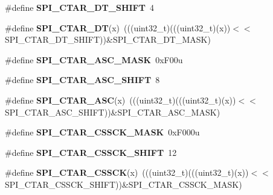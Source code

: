 \begin{DoxyCompactItemize}
\item 
\#define {\bfseries S\+P\+I\+\_\+\+C\+T\+A\+R\+\_\+\+D\+T\+\_\+\+S\+H\+I\+FT}~4\hypertarget{group__SPI__Register__Masks_gaac557ee81ac4ec00ee6280d5b761edf1}{}\label{group__SPI__Register__Masks_gaac557ee81ac4ec00ee6280d5b761edf1}

\item 
\#define {\bfseries S\+P\+I\+\_\+\+C\+T\+A\+R\+\_\+\+DT}(x)~(((uint32\+\_\+t)(((uint32\+\_\+t)(x))$<$$<$S\+P\+I\+\_\+\+C\+T\+A\+R\+\_\+\+D\+T\+\_\+\+S\+H\+I\+FT))\&S\+P\+I\+\_\+\+C\+T\+A\+R\+\_\+\+D\+T\+\_\+\+M\+A\+SK)\hypertarget{group__SPI__Register__Masks_ga48f6e8c7555056687cfcc2c56fc63c46}{}\label{group__SPI__Register__Masks_ga48f6e8c7555056687cfcc2c56fc63c46}

\item 
\#define {\bfseries S\+P\+I\+\_\+\+C\+T\+A\+R\+\_\+\+A\+S\+C\+\_\+\+M\+A\+SK}~0x\+F00u\hypertarget{group__SPI__Register__Masks_gad15c92f5474cc1ba1ca2af14c92cbf26}{}\label{group__SPI__Register__Masks_gad15c92f5474cc1ba1ca2af14c92cbf26}

\item 
\#define {\bfseries S\+P\+I\+\_\+\+C\+T\+A\+R\+\_\+\+A\+S\+C\+\_\+\+S\+H\+I\+FT}~8\hypertarget{group__SPI__Register__Masks_gadbf91ef3bf1d4943ab782ff027d121bd}{}\label{group__SPI__Register__Masks_gadbf91ef3bf1d4943ab782ff027d121bd}

\item 
\#define {\bfseries S\+P\+I\+\_\+\+C\+T\+A\+R\+\_\+\+A\+SC}(x)~(((uint32\+\_\+t)(((uint32\+\_\+t)(x))$<$$<$S\+P\+I\+\_\+\+C\+T\+A\+R\+\_\+\+A\+S\+C\+\_\+\+S\+H\+I\+FT))\&S\+P\+I\+\_\+\+C\+T\+A\+R\+\_\+\+A\+S\+C\+\_\+\+M\+A\+SK)\hypertarget{group__SPI__Register__Masks_ga2cd43b6b9241829083a88d903cc1ca2a}{}\label{group__SPI__Register__Masks_ga2cd43b6b9241829083a88d903cc1ca2a}

\item 
\#define {\bfseries S\+P\+I\+\_\+\+C\+T\+A\+R\+\_\+\+C\+S\+S\+C\+K\+\_\+\+M\+A\+SK}~0x\+F000u\hypertarget{group__SPI__Register__Masks_ga5c824276fa48ae7b05fc922d20d237c0}{}\label{group__SPI__Register__Masks_ga5c824276fa48ae7b05fc922d20d237c0}

\item 
\#define {\bfseries S\+P\+I\+\_\+\+C\+T\+A\+R\+\_\+\+C\+S\+S\+C\+K\+\_\+\+S\+H\+I\+FT}~12\hypertarget{group__SPI__Register__Masks_gaf4e35373d2e9149e1c73f9b65887ad37}{}\label{group__SPI__Register__Masks_gaf4e35373d2e9149e1c73f9b65887ad37}

\item 
\#define {\bfseries S\+P\+I\+\_\+\+C\+T\+A\+R\+\_\+\+C\+S\+S\+CK}(x)~(((uint32\+\_\+t)(((uint32\+\_\+t)(x))$<$$<$S\+P\+I\+\_\+\+C\+T\+A\+R\+\_\+\+C\+S\+S\+C\+K\+\_\+\+S\+H\+I\+FT))\&S\+P\+I\+\_\+\+C\+T\+A\+R\+\_\+\+C\+S\+S\+C\+K\+\_\+\+M\+A\+SK)\hypertarget{group__SPI__Register__Masks_ga3c988f51f8a9ffc42af2b1c780796666}{}\label{group__SPI__Register__Masks_ga3c988f51f8a9ffc42af2b1c780796666}


\end{DoxyCompactItemize}
